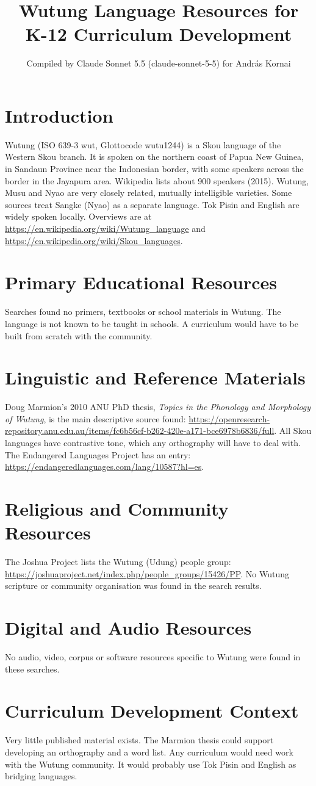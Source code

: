 \documentclass[12pt]{article}
\title{Wutung Language Resources for K-12 Curriculum Development}
\author{Compiled by Claude Sonnet 5.5 (claude-sonnet-5-5) for Andr\'as Kornai}
\date{}
\begin{document}
\maketitle

\section{Introduction}
Wutung (ISO 639-3 wut, Glottocode wutu1244) is a Skou language of the Western Skou branch. It is spoken on the northern coast of Papua New Guinea, in Sandaun Province near the Indonesian border, with some speakers across the border in the Jayapura area. Wikipedia lists about 900 speakers (2015). Wutung, Musu and Nyao are very closely related, mutually intelligible varieties. Some sources treat Sangke (Nyao) as a separate language. Tok Pisin and English are widely spoken locally. Overviews are at \url{https://en.wikipedia.org/wiki/Wutung_language} and \url{https://en.wikipedia.org/wiki/Skou_languages}.

\section{Primary Educational Resources}
Searches found no primers, textbooks or school materials in Wutung. The language is not known to be taught in schools. A curriculum would have to be built from scratch with the community.

\section{Linguistic and Reference Materials}
Doug Marmion's 2010 ANU PhD thesis, \emph{Topics in the Phonology and Morphology of Wutung}, is the main descriptive source found: \url{https://openresearch-repository.anu.edu.au/items/fc6b56cf-b262-420e-a171-bce6978b6836/full}. All Skou languages have contrastive tone, which any orthography will have to deal with. The Endangered Languages Project has an entry: \url{https://endangeredlanguages.com/lang/10587?hl=es}.

\section{Religious and Community Resources}
The Joshua Project lists the Wutung (Udung) people group: \url{https://joshuaproject.net/index.php/people_groups/15426/PP}. No Wutung scripture or community organisation was found in the search results.

\section{Digital and Audio Resources}
No audio, video, corpus or software resources specific to Wutung were found in these searches.

\section{Curriculum Development Context}
Very little published material exists. The Marmion thesis could support developing an orthography and a word list. Any curriculum would need work with the Wutung community. It would probably use Tok Pisin and English as bridging languages.
\end{document}
